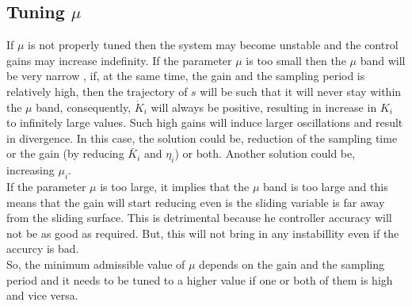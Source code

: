 \documentclass{article}
\begin{document}
\subsection{Tuning $\mu$}
If $\mu$ is not properly tuned then the system may become unstable and the control gains may increase indefinity. If the parameter $\mu$ is too small then the $\mu$ band will be very narrow , if, at the same time, the gain  and the sampling period is relatively high, then the trajectory of $s$ will be such that it will never stay within the $\mu$ band, consequently, $\dot{K}_i$ will always be positive, resulting in increase in $K_i$ to infinitely large values. Such high gains will induce larger oscillations and result in divergence. In this case, the solution could be, reduction of the sampling time or the gain (by reducing $\bar{K}_i$ and $\eta_i$) or both. Another solution could be, increasing $\mu_i$.\\
If the parameter $\mu$ is too large, it implies that the $\mu$ band is too large and this means that the gain will start reducing even is the sliding variable is far away from the sliding surface. This is detrimental because he controller accuracy will not be as good as required. But, this will not bring in any instabillity even if the accurcy is bad.\\
So, the minimum admissible value of $\mu$ depends on the gain and the sampling period and it needs to be tuned to a higher value if one or both of them is high and vice versa.
\end{document}
